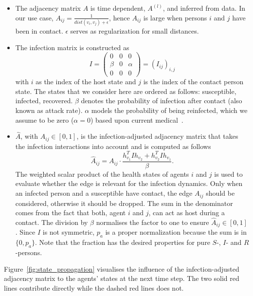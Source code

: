 \begin{itemize}
	\item The adjacency matrix $A$ is time dependent, $A^{(l)}$, and inferred from data. In our use case, $A_{ij} = \frac{1}{dist(v_i, v_j)+\epsilon}$, hence $A_{ij}$ is large when persons $i$ and $j$ have been in contact. $\epsilon$ serves as regularization for small distances.
	\item The infection matrix is constructed as
	\begin{equation}
	I =
	\begin{pmatrix}
	0     &  0  & 0 \\
	\beta &  0  & \alpha \\
	0     &  0  & 0
	\end{pmatrix}
	=
	(I_{ij})_{i,j}
	\end{equation}
	with $i$ as the index of the host state and $j$ is the index of the contact person state. The states that we consider here are ordered as follows: susceptible, infected, recovered. $\beta$ denotes the probability of infection  after contact (also known as attack rate). $\alpha$ models the probability of being reinfected, which we assume to be zero ($\alpha=0$) based upon current medical~\cite{Bao2020.03.13.990226}.
	\item $\hat{A}$, with $\hat{A}_{ij}\in [0, 1]$, is the infection-adjusted adjacency matrix that takes the infection interactions into account and is computed as follows
	\begin{equation}
	\hat{A}_{ij} = A_{ij}\cdot \frac{ h_{v_1}^T I h_{v_2} + h_{v_2}^T I h_{v_1} }{\beta}.
	\end{equation}
	The weighted scalar product of the health states of agents $i$ and $j$ is used to evaluate whether the edge is relevant for the infection dynamics. Only when an infected person and a susceptible have contact, the edge $A_{ij}$ should be considered, otherwise it should be dropped.	The sum in the denominator comes from the fact that both, agent $i$ and $j$, can act as host during a contact. The division by $\beta$ normalises the factor to one to ensure $\hat{A}_{ij} \in [0, 1]$. Since $I$ is not symmetric, $p_a$ is a proper normalization because the sum is in $\{0, p_a\}$. Note that the fraction has the desired properties for pure $S$-, $I$- and $R$-persons.
\end{itemize}

Figure~\ref{fig:state_propagation} visualises the influence of the infection-adjusted adjacency matrix to the agents' states at the next time step. The two solid red lines contribute directly while the dashed red lines does not.

